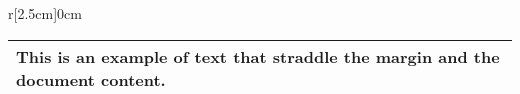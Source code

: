 \documentclass{article}
\begin{document}
	
	\lipsum[1-2]
	
		
	
	\begin{wrapfigure}{r}[2.5cm]{0cm}
		\vspace{10\baselineskip}
		\begin{tabular}{p{5cm}}
			\toprule
			This is an example of text that straddle the margin and the document content.
			
			\footnotemark\\
			\bottomrule
		\end{tabular}
	\end{wrapfigure}
	
	
	\lipsum[3-4]	
\end{document}
